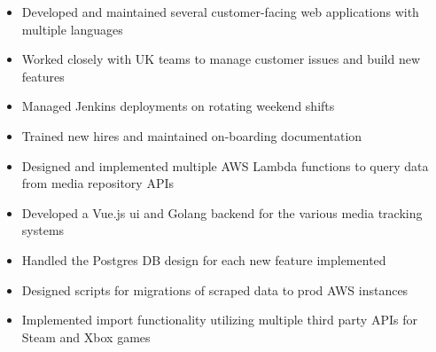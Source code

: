 \documentclass[10pt,a4paper,ragged2e]{altacv}
\begin{document}
\tagline{}


\begin{fullwidth}
\makecvheader
\end{fullwidth}



\begin{itemize}
\item Developed and maintained several customer-facing web applications with multiple languages
\item Worked closely with UK teams to manage customer issues and build new features
\item Managed Jenkins deployments on rotating weekend shifts
\item Trained new hires and maintained on-boarding documentation
\end{itemize}

\divider

\begin{itemize}
\item Designed and implemented multiple AWS Lambda functions to query data from media repository APIs
\item Developed a Vue.js ui and Golang backend for the various media tracking systems 
\item Handled the Postgres DB design for each new feature implemented
\item Designed scripts for migrations of scraped data to prod AWS instances
\item Implemented import functionality utilizing multiple third party APIs for Steam and Xbox games
\end{itemize}
\end{document}
